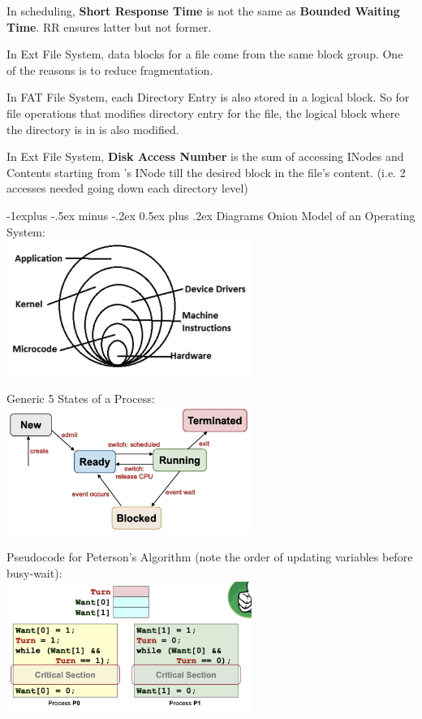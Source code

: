 \documentclass[10pt,landscape,letterpaper]{article}
\makeatletter
\renewcommand{\subsection}{\@startsection{subsection}{2}{0mm}%
                                {-1explus -.5ex minus -.2ex}%
                                {0.5ex plus .2ex}%
                                {\sffamily\normalsize\itshape}}
\makeatother
\begin{document}
\begin{multicols}{3}
 In scheduling, \textbf{Short Response Time} is not the same as \textbf{Bounded Waiting Time}. RR ensures latter but not former.

\medskip

 In Ext File System, data blocks for a file come from the same block group. One of the reasons is to reduce fragmentation.

\medskip

 In FAT File System, each Directory Entry is also stored in a logical block. So for file operations that modifies directory entry for the file, the logical block where the directory is in is also modified.

\medskip

 In Ext File System, \textbf{Disk Access Number} is the sum of accessing INodes and Contents starting from 's INode till the desired block in the file's content. (i.e. 2 accesses needed going down each directory level)




\subsection{Diagrams}
Onion Model of an Operating System:
\\
\includegraphics[width=8cm]{img/01_onion_model.png}

Generic 5 States of a Process:
\\
\includegraphics[width=8cm]{img/02_process_5_state.png}

Pseudocode for Peterson's Algorithm (note the order of updating variables before busy-wait):
\\
\includegraphics[width=8cm]{img/06_peterson.png}


\end{multicols}
\end{document}
